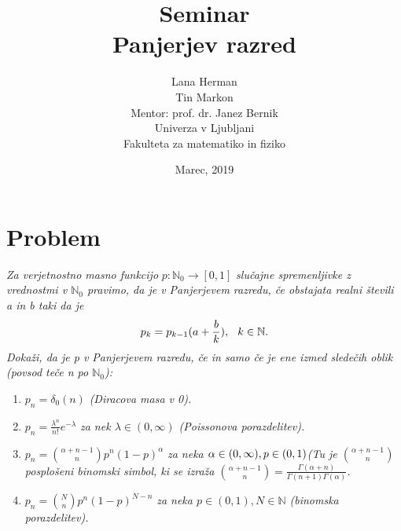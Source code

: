 \documentclass[a4paper]{article}
\title{Seminar \\\vspace{2cm} {\huge Panjerjev razred}\vspace{2cm}}
\author{Lana Herman \\[1.5mm] Tin Markon \\[1.5mm]\vspace{7cm}
Mentor: prof. dr. Janez Bernik \\
Univerza v Ljubljani \\[1.5mm]
Fakulteta za matematiko in fiziko \vspace{3cm}}
\date{Marec, 2019}
\begin{document}
\begin{titlepage}
\clearpage \maketitle
\thispagestyle{empty}
\end{titlepage} 


\tableofcontents
\pagebreak

\maketitle
\section{Problem}
\textit{Za verjetnostno masno funkcijo} $p : \mathbb{N}_{0} \rightarrow [0, 1]$ \textit{slučajne spremenljivke z vrednostmi v $\mathbb{N}_{0}$ pravimo, da je v Panjerjevem razredu, če obstajata realni števili a in b taki da je}
$$p_k = p_{k-1}(a + \frac{b}{k}), \hspace{0.25cm}  k \in \mathbb{N}.$$
\textit{Dokaži, da je p v Panjerjevem razredu, če in samo če je ene izmed sledečih oblik (povsod teče n po $\mathbb{N}_{0}$):}
\begin{enumerate}
	\item $p_n = \delta_{0}(n)$ \textit{(Diracova masa v 0).}
	\item $p_n = \frac{\lambda^n}{n!}e^{-\lambda}$ \textit{za nek $\lambda \in (0, \infty)$ (Poissonova porazdelitev).}
	\item $p_n = {{\alpha + n - 1}\choose n}p^n(1-p)^{\alpha}$ \textit{za neka $\alpha \in (0, \infty), p \in (0,1) \\ $(Tu je ${{\alpha + n - 1}\choose n}$ posplošeni binomski simbol, ki se izraža ${{\alpha + n - 1}\choose n}=\frac{\Gamma(\alpha + n)}{\Gamma(n+1)\Gamma(\alpha)}$.}
	\item $p_n = {N \choose n}p^n(1-p)^{N-n}$ \textit{za neka $p \in (0,1), N \in \mathbb{N}$ (binomska porazdelitev).}
\end{enumerate}
\vspace{0.5cm}
\end{document}
